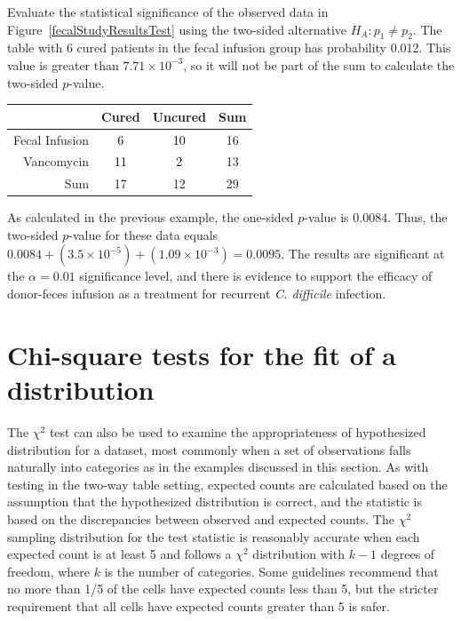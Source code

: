 \begin{examplewrap}
\begin{nexample}{Evaluate the statistical significance of the observed data in Figure~\ref{fecalStudyResultsTest} using the two-sided alternative $H_A: p_1 \neq p_2$.}
The table with 6 cured patients in the fecal infusion group has probability 0.012. This value is greater than $7.71 \times 10^{-3}$, so it will not be part of the sum to calculate the two-sided $p$-value.
	
\begin{center}
	\color{gray}
	\begin{tabular}{r|cc|c}
		\hline
		& Cured & Uncured & Sum \\ 
		\hline
		Fecal Infusion & \textcolor{black}{6} & \textcolor{black}{10} & 16 \\ 
		Vancomycin & \textcolor{black}{11} & \textcolor{black}{2} & 13 \\ 
		\hline
		Sum & 17 & 12 & 29 \\ 
		\hline
	\end{tabular}
\end{center}

As calculated in the previous example, the one-sided $p$-value is $0.0084$. Thus, the two-sided $p$-value for these data equals $0.0084 + (3.5 \times 10^{-5}) + (1.09 \times 10^{-3}) = 0.0095$. The results are significant at the $\alpha = 0.01$ significance level, and there is evidence to support the efficacy of donor-feces infusion as a treatment for recurrent \textit{C. difficile} infection.
\end{nexample}
\end{examplewrap}



\section[Chi-square tests for the fit of a distribution]{Chi-square tests for the fit of a distribution}
\label{oneWayChiSquare}

The $\chi^2$ test can also be used to examine the appropriateness of hypothesized distribution for a dataset, most commonly when a set of observations falls naturally into categories as in the examples discussed in this section. As with testing in the two-way table setting, expected counts are calculated based on the assumption that the hypothesized distribution is correct, and the statistic is based on the discrepancies between observed and expected counts. The  $\chi^2$ sampling distribution for the test statistic is reasonably accurate when each expected count is at least 5 and follows a $\chi^2$ distribution with $k-1$ degrees of freedom, where $k$ is the number of categories.  Some guidelines recommend that no more than 1/5 of the cells have expected counts less than 5, but the stricter requirement that all cells have expected counts greater than 5 is safer.

